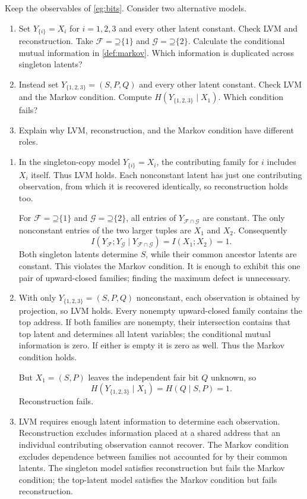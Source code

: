 \documentclass[11pt]{article}
\newcommand{\Up}{\mathord{\supseteq}}
\begin{document}
\begin{exercise}
\label{ex:failed}\important
Keep the observables of \cref{eg:bits}. Consider two alternative models.
\begin{enumerate}
\item Set $Y_{\{i\}}=X_i$ for $i=1,2,3$ and every other latent constant.
Check LVM and reconstruction. Take
$\mathcal{F}=\Up\{1\}$ and $\mathcal{G}=\Up\{2\}$.
Calculate the conditional mutual information in \cref{def:markov}.
Which information is duplicated across singleton latents?
\item Instead set $Y_{\{1,2,3\}}=(S,P,Q)$ and every other latent constant.
Check LVM and the Markov condition. Compute
$H(Y_{\{1,2,3\}}\mid X_1)$. Which condition fails?
\item Explain why LVM, reconstruction, and the
Markov condition have different roles.
\end{enumerate}
\end{exercise}
\begin{solution}[ex:failed]
\begin{enumerate}
\item In the singleton-copy model $Y_{\{i\}}=X_i$, the contributing family
for $i$ includes $X_i$ itself. Thus LVM holds. Each
nonconstant latent has just one contributing observation, from which it is
recovered identically, so reconstruction holds too.

For $\mathcal{F}=\Up\{1\}$ and $\mathcal{G}=\Up\{2\}$, all entries
of $Y_{\mathcal{F}\cap\mathcal{G}}$ are constant. The only nonconstant entries
of the two larger tuples are $X_1$ and $X_2$. Consequently
\[
 I(Y_{\mathcal{F}};Y_{\mathcal{G}}\mid Y_{\mathcal{F}\cap\mathcal{G}})
 =I(X_1;X_2)=1.
\]
Both singleton latents determine $S$, while their common ancestor latents are
constant. This violates the Markov condition. It is enough to
exhibit this one pair of upward-closed families; finding the maximum defect
is unnecessary.
\item With only $Y_{\{1,2,3\}}=(S,P,Q)$ nonconstant, each observation is
obtained by projection, so LVM holds. Every nonempty
upward-closed family contains the top address. If both families are nonempty,
their intersection contains that top latent and determines all latent variables;
the conditional mutual information is zero. If either is empty it is zero as
well. Thus the Markov condition holds.

But $X_1=(S,P)$ leaves the independent fair bit $Q$ unknown, so
\[
 H(Y_{\{1,2,3\}}\mid X_1)=H(Q\mid S,P)=1.
\]
Reconstruction fails.
\item LVM requires enough latent information to determine
each observation. Reconstruction excludes information placed at a shared
address that an individual contributing observation cannot recover. The Markov
condition excludes dependence between families not accounted for
by their common latents. The singleton model satisfies reconstruction but
fails the Markov condition; the top-latent model satisfies the Markov condition
but fails reconstruction.
\end{enumerate}

\end{solution}
\end{document}

